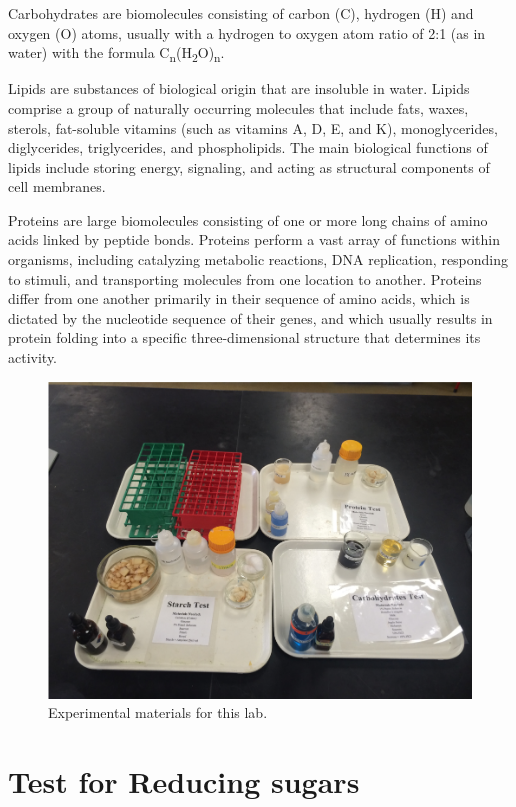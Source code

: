 Carbohydrates are biomolecules consisting of carbon (C), hydrogen (H)
and oxygen (O) atoms, usually with a hydrogen to oxygen atom ratio of
2:1 (as in water) with the formula
C\textsubscript{n}(H\textsubscript{2}O)\textsubscript{n}.

Lipids are substances of biological origin that are insoluble in water.
Lipids comprise a group of naturally occurring molecules that include
fats, waxes, sterols, fat-soluble vitamins (such as vitamins A, D, E,
and K), monoglycerides, diglycerides, triglycerides, and phospholipids.
The main biological functions of lipids include storing energy,
signaling, and acting as structural components of cell membranes.

Proteins are large biomolecules consisting of one or more long chains of
amino acids linked by peptide bonds. Proteins perform a vast array of
functions within organisms, including catalyzing metabolic reactions,
DNA replication, responding to stimuli, and transporting molecules from
one location to another. Proteins differ from one another primarily in
their sequence of amino acids, which is dictated by the nucleotide
sequence of their genes, and which usually results in protein folding
into a specific three-dimensional structure that determines its
activity.

\begin{figure}

{\centering \includegraphics[width=0.7\linewidth]{./figures/chem_aspects/Setup} 

}

\caption{Experimental materials for this lab.}\label{fig:setup}
\end{figure}

\section{Test for Reducing sugars}\label{test-for-reducing-sugars}


